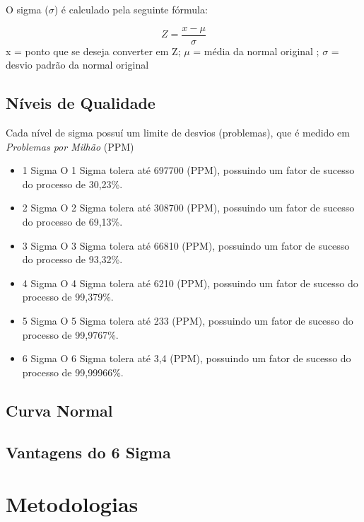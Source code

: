 \documentclass{abnt}
\begin{document}
			O sigma ($\sigma$) é calculado pela seguinte fórmula: 
			\begin{center}
			    \begin{equation}
			       Z = \frac{x - \mu}{\sigma}
		        \end{equation}
		     x = ponto que se deseja converter em Z; $\mu$ =  média da normal original ; $\sigma$ = desvio padrão da normal original
			\end{center}
			
			 
		\section {Níveis de Qualidade}
		    Cada nível de sigma possuí um limite de desvios (problemas), que é medido em  \textit{Problemas por Milhão} (PPM) 
			\begin{itemize}
			    \item {1 Sigma}
			        \subitem O 1 Sigma tolera até 697700 (PPM), possuindo um fator de sucesso do processo de 30,23\%. 
			    \item {2 Sigma}
			        \subitem O 2 Sigma tolera até 308700 (PPM), possuindo um fator de sucesso do processo de 69,13\%.
			    \item {3 Sigma}
			        \subitem O 3 Sigma tolera até 66810 (PPM), possuindo um fator de sucesso do processo de 93,32\%.
			    \item {4 Sigma}
			        \subitem O 4 Sigma tolera até 6210 (PPM), possuindo um fator de sucesso do processo de 99,379\%.
			    \item {5 Sigma}
			        \subitem O 5 Sigma tolera até 233 (PPM), possuindo um fator de sucesso do processo de 99,9767\%.
			    \item {6 Sigma}
			        \subitem O 6 Sigma tolera até 3,4 (PPM), possuindo um fator de sucesso do processo de 99,99966\%.
			\end{itemize}
		\section {Curva Normal} 
		    
		\section {Vantagens do 6 Sigma}
				
	\chapter {Metodologias}
\end{document}
